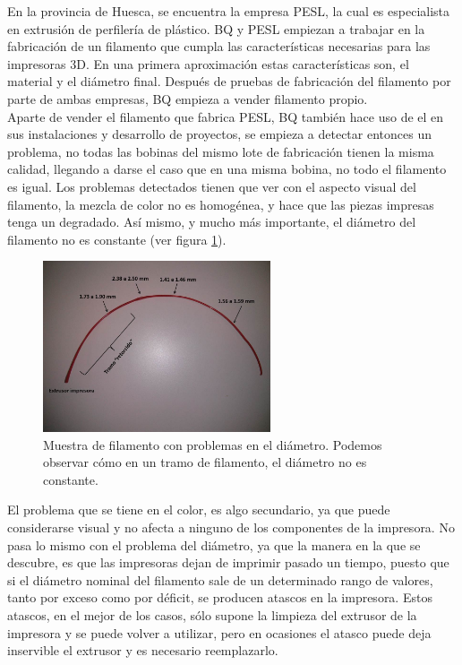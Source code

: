 En la provincia de Huesca, se encuentra la empresa PESL, la cual es especialista en extrusión de perfilería de plástico. BQ y PESL empiezan a trabajar en la fabricación de un filamento que cumpla las características necesarias para las impresoras 3D. En una primera aproximación estas características son, el material y el diámetro final. Después de pruebas de fabricación del filamento por parte de ambas empresas, BQ empieza a vender filamento propio.\\

Aparte de vender el filamento que fabrica PESL, BQ también hace uso de el en sus instalaciones y desarrollo de proyectos, se empieza a detectar entonces un problema, no todas las bobinas del mismo lote de fabricación tienen la misma calidad, llegando a darse el caso que en una misma bobina, no todo el filamento es igual. Los problemas detectados tienen que ver con el aspecto visual del filamento, la mezcla de color no es homogénea, y hace que las piezas impresas tenga un degradado. Así mismo, y mucho más importante, el diámetro del filamento no es constante (ver figura \ref{fig:muestra_filamento}).

\begin{figure}[H]
    \centering
    \includegraphics[width=0.6\textwidth]{images/atasco_rojo.jpg}
    \caption[Muestra de filamento con problemas en el diámetro]{Muestra de filamento con problemas en el diámetro. Podemos observar cómo en un tramo de filamento, el diámetro no es constante.}
    \label{fig:muestra_filamento}
\end{figure}

El problema que se tiene en el color, es algo secundario, ya que puede considerarse visual y no afecta a ninguno de los componentes de la impresora. No pasa lo mismo con el problema del diámetro, ya que la manera en la que se descubre, es que las impresoras dejan de imprimir pasado un tiempo, puesto que si el diámetro nominal del filamento sale de un determinado rango de valores, tanto por exceso como por déficit, se producen atascos en la impresora. Estos atascos, en el mejor de los casos, sólo supone la limpieza del extrusor de la impresora y se puede volver a utilizar, pero en ocasiones el atasco puede deja inservible el extrusor y es necesario reemplazarlo.\\

